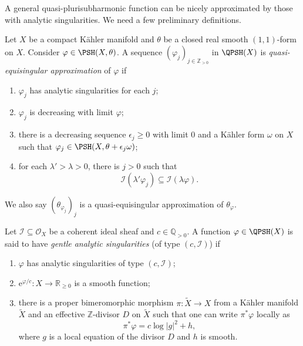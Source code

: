 A general quasi-plurisubharmonic function can be nicely approximated by those with analytic singularities. We need a few preliminary definitions.
\begin{definition}\label{def:quasiequsing}
    Let $X$ be a compact Kähler manifold and $\theta$ be a closed real smooth $(1,1)$-form on $X$. Consider $\varphi\in \PSH(X,\theta)$. A sequence $(\varphi_j)_{j\in \mathbb{Z}_{>0}}$ in $\QPSH(X)$ is \emph{quasi-equisingular approximation}  of $\varphi$ if
    \begin{enumerate}
        \item\label{itm:def:quasiequsing:1} $\varphi_j$ has analytic singularities for each $j$;
        \item\label{itm:def:quasiequsing:2} $\varphi_j$ is decreasing with limit $\varphi$;
        \item\label{itm:def:quasiequsing:3} there is a decreasing sequence $\epsilon_j\geq 0$ with limit $0$ and a Kähler form $\omega$ on $X$ such that $\varphi_j\in \PSH(X,\theta+\epsilon_j\omega)$;
        \item\label{itm:def:quasiequsing:4} for each $\lambda'>\lambda>0$, there is $j>0$ such that
        \begin{equation}\label{eq:quasi_eq_prop}
        \mathcal{I}(\lambda' \varphi_j)\subseteq \mathcal{I}(\lambda \varphi).
        \end{equation}
    \end{enumerate}
    We also say $(\theta_{\varphi_j})_j$ is a quasi-equisingular approximation of $\theta_{\varphi}$.
\end{definition}

\begin{definition}\label{def:analy-sing}
    Let $\mathcal{I}\subseteq\mathcal O_X$ be a coherent ideal sheaf and $c\in\mathbb{Q}_{>0}$. A function $\varphi\in \QPSH(X)$ is said to have \emph{gentle analytic singularities}  (of type $(c,\mathcal{I})$) if
\begin{enumerate}
    \item\label{itm:def:analy-sing:1} $\varphi$ has analytic singularities of type $(c,\mathcal{I})$;
    \item\label{itm:def:analy-sing:2} $\mathrm{e}^{{\varphi}/{c}}\colon X\to \mathbb{R}_{\geq 0}$ is a smooth function;
    \item\label{itm:def:analy-sing:3} there is a proper bimeromorphic morphism $\pi\colon \widetilde{X}\to X$ from a Kähler manifold $\widetilde{X}$ and an effective $\mathbb{Z}$-divisor $D$ on $\widetilde{X}$ such that one can write $\pi^*\varphi$ locally as
    \[
        \pi^*\varphi=c\log|g|^2+h,
    \]
    where $g$ is a local equation of the divisor $D$ and $h$ is smooth.
\end{enumerate}
\end{definition}

